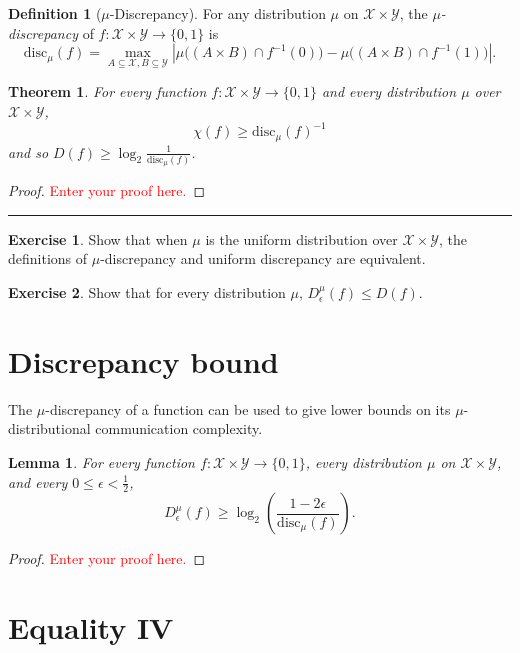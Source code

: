 \documentclass[11pt]{amsart}
\theoremstyle{plain}
\newtheorem{theorem}{Theorem}
\newtheorem{lemma}{Lemma}
\theoremstyle{definition}
\newtheorem{definition}{Definition}
\newtheorem{exercise}{Exercise}
\theoremstyle{plain}
\newcommand{\calX}{\mathcal{X}}
\newcommand{\calY}{\mathcal{Y}}
\newcommand{\disc}{\mathrm{disc}}
\newcommand{\replacethistext}[1]{\textcolor{red}{#1}}
\newcommand{\exercises}{\bigskip \noindent\rule{8cm}{0.4pt} \medskip}
\begin{document}
\begin{definition}[$\mu$-Discrepancy]
For any distribution $\mu$ on $\calX \times \calY$, 
the \emph{$\mu$-discrepancy} of $f : \calX \times \calY \to \{0,1\}$ is
\[
\disc_\mu(f) = \max_{A \subseteq \calX, B \subseteq \calY} 
\left| \mu\big( (A \times B) \cap f^{-1}(0) \big) - \mu\big( (A \times B) \cap f^{-1}(1)\big) \right|.
\]
\end{definition}

\begin{theorem}
For every function $f : \calX \times \calY \to \{0,1\}$ and every distribution $\mu$ over $\calX \times \calY$, 
\[
\chi(f) \ge \disc_\mu(f)^{-1}
\] 
and so $D(f) \ge \log_2 \frac1{\disc_\mu(f)}$.
\end{theorem}

\begin{proof}
\replacethistext{Enter your proof here.}
\end{proof}

\exercises

\begin{exercise}
Show that when $\mu$ is the uniform distribution over $\calX \times \calY$, the definitions of $\mu$-discrepancy and uniform discrepancy are equivalent.
\end{exercise}

\begin{exercise}
Show that for every distribution $\mu$, $D^\mu_\epsilon(f) \le D(f)$.
\end{exercise}


\newpage \section{Discrepancy bound}

The $\mu$-discrepancy of a function can be used to give lower bounds on its $\mu$-distributional communication complexity.

\begin{lemma}
For every function $f : \calX \times \calY \to \{0,1\}$, every distribution $\mu$ on $\calX \times \calY$, and every $0 \le \epsilon < \frac12$,
\[
D_\epsilon^{\mu}(f) \ge \log_2 \left( \frac{1-2\epsilon}{\disc_\mu(f)} \right).
\]
\end{lemma}

\begin{proof}
\replacethistext{Enter your proof here.}
\end{proof}


\newpage \section{Equality IV}
\end{document}
